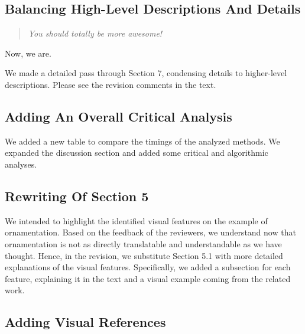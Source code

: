 \documentclass{egpubl}
\newcommand{\rev}[2]{{\color{greenrev}\textsuperscript{#1}#2}}
\renewcommand{\rev}[2]{{#2}}
\begin{document}
\subsection*{Balancing High-Level Descriptions And Details}


\begin{quote}
\emph{
    You should totally be more awesome!
    }
\end{quote}
Now, we are.



\rev{}{We made a detailed pass through Section 7, condensing details to higher-level descriptions. Please see the revision comments in the text.}

\subsection*{Adding An Overall Critical Analysis}

\rev{}{We added a new table to compare the timings of the analyzed methods. We expanded the discussion section and added some critical and algorithmic analyses.}

\subsection*{Rewriting Of Section 5}

\rev{}{We intended to highlight the identified visual features on the example of ornamentation. Based on the feedback of the reviewers, we understand now that ornamentation is not as directly translatable and understandable as we have thought. Hence, in the revision, we substitute Section 5.1 with more detailed explanations of the visual features. Specifically, we added a subsection for each feature, explaining it in the text and a visual example coming from the related work.}

\subsection*{Adding Visual References}
\end{document}

